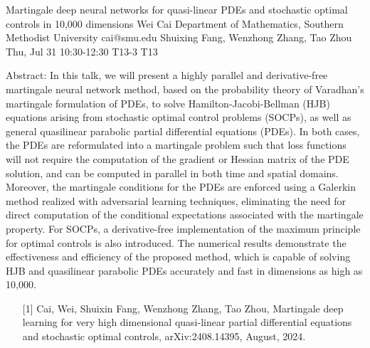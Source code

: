 \begin{talk}
  {Martingale deep neural networks for quasi-linear PDEs and stochastic optimal controls in 10,000 dimensions}%
  {Wei Cai}%
  {Department of Mathematics, Southern Methodist University}%
  {cai@smu.edu}%
  {Shuixing Fang, Wenzhong Zhang, Tao Zhou}%
  {}%
  {Thu, Jul 31 10:30-12:30}%
  {T13-3}%
  {T13}%
  
				
			
Abstract: In this talk, we will present a highly parallel and derivative-free martingale neural network method, based on the probability theory of Varadhan’s martingale formulation of PDEs, to solve Hamilton-Jacobi-Bellman (HJB) equations arising from stochastic optimal control problems (SOCPs), as well as general quasilinear parabolic partial differential equations (PDEs). In both cases, the PDEs are reformulated into a martingale problem such that loss functions will not require the computation of the gradient or Hessian matrix of the PDE solution, and can be computed in parallel in both time and spatial domains. Moreover, the martingale conditions for the PDEs are enforced using a Galerkin method realized with adversarial learning techniques, eliminating the need for direct computation of the conditional expectations associated with the martingale property. For SOCPs, a derivative-free implementation of the maximum principle for optimal controls is also introduced. The numerical results demonstrate the effectiveness and efficiency of the proposed method, which is capable of solving HJB and quasilinear parabolic PDEs accurately and fast in dimensions as high as 10,000.

\medskip

\begin{enumerate}
	\item[{[1]}] Cai,  Wei, Shuixin Fang, Wenzhong Zhang, Tao Zhou, Martingale deep learning for very high dimensional quasi-linear partial differential equations and stochastic optimal controls,  arXiv:2408.14395, August, 2024. 
\end{enumerate}

 
\end{talk}

